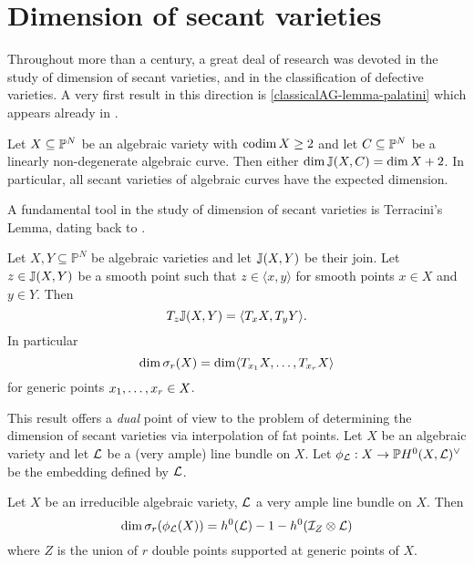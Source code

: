 \section{Dimension of secant varieties}
\label{classicalAG-section-dimension}

Throughout more than a century, a great deal of research was devoted in the study of dimension of secant varieties, and in the classification of defective varieties. A very first result in this direction is \ref{classicalAG-lemma-palatini} which appears already in \cite{Pal09}. 

\begin{lemma}
\label{classicalAG-lemma-palatini}
Let $X \subseteq \mathbb{P}^N$ be an algebraic variety with $\operatorname{codim} X \geq 2$ and let $C \subseteq \mathbb{P}^N$ be a linearly non-degenerate algebraic curve. Then either $\dim \mathbb{J}(X,C) = \dim X + 2$. In particular, all secant varieties of algebraic curves have the expected dimension.
\end{lemma}


A fundamental tool in the study of dimension of secant varieties is Terracini's Lemma, dating back to \cite{Ter11}.
\begin{lemma}
\label{classicalAG-lemma-terracini}
Let $X, Y \subseteq \mathbb{P}^N$ be algebraic varieties and let $\mathbb{J}(X,Y)$ be their join. Let $z \in \mathbb{J}(X,Y)$ be a smooth point such that $z \in \langle x , y \rangle$ for smooth points $x \in X$ and $y \in Y$. Then
\[
T_{z} \mathbb{J}(X,Y) = \langle T_x X , T_y Y\rangle.
\]
In particular 
\[
\dim \sigma_r(X) = \dim \langle T_{x_1} X , \ldots , T_{x_r} X\rangle
\]
for generic points $x_1 , \ldots , x_r \in X$.
\end{lemma}
This result offers a \emph{dual} point of view to the problem of determining the dimension of secant varieties via interpolation of fat points. Let $X$ be an algebraic variety and let $\mathcal{L}$ be a (very ample) line bundle on $X$. Let $\phi_{\mathcal{L}} : X \to \mathbb{P} H^0(X, \mathcal{L})^\vee$ be the embedding defined by $\mathcal{L}$. 
\begin{proposition}
 \label{classicalAG-proposition-interpolationfatpoints}
 Let $X$ be an irreducible algebraic variety, $\mathcal{L}$ a very ample line bundle on $X$. Then
 \[
 \dim \sigma_r( \phi_{\mathcal{L}}(X)) = h^0(\mathcal{L})-1 - h^0( \mathcal{I}_{Z} \otimes \mathcal{L})
 \]
 where $Z$ is the union of $r$ double points supported at generic points of $X$.
\end{proposition}




